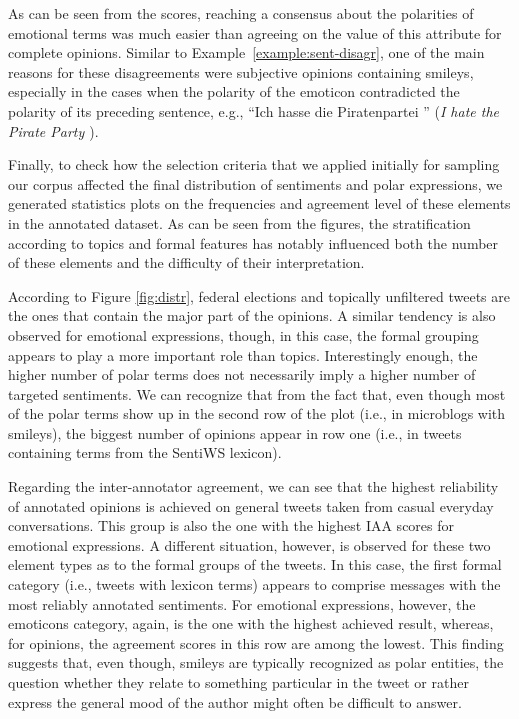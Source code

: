 As can be seen from the scores, reaching a consensus about the
polarities of emotional terms was much easier than agreeing on the
value of this attribute for complete opinions.  Similar to
Example~\ref{example:sent-disagr}, one of the main reasons for these
disagreements were subjective opinions containing smileys, especially
in the cases when the polarity of the emoticon contradicted the
polarity of its preceding sentence, e.g., ``Ich hasse die
Piratenpartei \smiley{}'' (\emph{I hate the Pirate Party {\upshape
    \smiley{}}}).

Finally, to check how the selection criteria that we applied initially
for sampling our corpus affected the final distribution of sentiments
and polar expressions, we generated statistics plots on the
frequencies and agreement level of these elements in the annotated
dataset.  As can be seen from the figures, the stratification
according to topics and formal features has notably influenced both
the number of these elements and the difficulty of their
interpretation.

According to Figure \ref{fig:distr}, federal elections and topically
unfiltered tweets are the ones that contain the major part of the
opinions.  A similar tendency is also observed for emotional
expressions, though, in this case, the formal grouping appears to play
a more important role than topics.  Interestingly enough, the higher
number of polar terms does not necessarily imply a higher number of
targeted sentiments.  We can recognize that from the fact that, even
though most of the polar terms show up in the second row of the plot
(i.e., in microblogs with smileys), the biggest number of opinions
appear in row one (i.e., in tweets containing terms from the SentiWS
lexicon).

Regarding the inter-annotator agreement, we can see that the highest
reliability of annotated opinions is achieved on general tweets taken
from casual everyday conversations.  This group is also the one with
the highest IAA scores for emotional expressions.  A different
situation, however, is observed for these two element types as to the
formal groups of the tweets.  In this case, the first formal category
(i.e., tweets with lexicon terms) appears to comprise messages with
the most reliably annotated sentiments.  For emotional expressions,
however, the emoticons category, again, is the one with the highest
achieved result, whereas, for opinions, the agreement scores in this
row are among the lowest.  This finding suggests that, even though,
smileys are typically recognized as polar entities, the question
whether they relate to something particular in the tweet or rather
express the general mood of the author might often be difficult to
answer.

